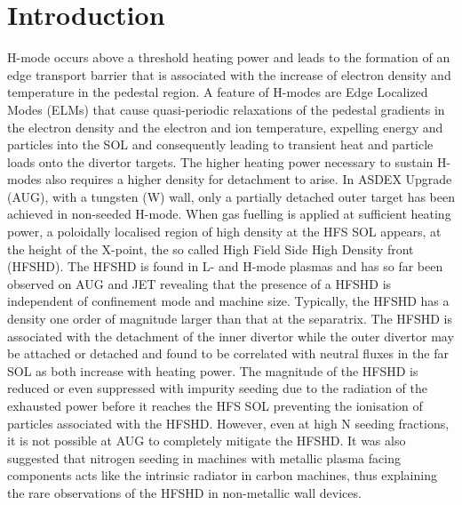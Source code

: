 \documentclass[12pt]{iopart}
\begin{document}
\section{Introduction}
\label{sec:intro}

H-mode occurs above a threshold heating power and leads to the formation of an edge transport barrier that is associated with the increase of electron density and temperature in the pedestal region\cite{wagner1982regime}. A feature of H-modes are Edge Localized Modes (ELMs)\cite{zohm1996edge} that cause quasi-periodic relaxations of the pedestal gradients in the electron density and the electron and ion temperature, expelling energy and particles into the SOL and consequently leading to transient heat and particle loads onto the divertor targets. The higher heating power necessary to sustain H-modes also requires a higher density for detachment\cite{LaBombard1987,krasheninnikov1998physical} to arise. In ASDEX Upgrade (AUG), with a tungsten (W) wall, only a partially detached outer target has been achieved in non-seeded H-mode. When gas fuelling is applied at sufficient heating power, a poloidally localised region of high density at the HFS SOL appears, at the height of the X-point, the so called High Field Side High Density front (HFSHD). The HFSHD is found in L- and H-mode plasmas and has so far been observed on AUG\cite{mccormick2009main,Potzel2015} and JET\cite{potzel2015formation} revealing that the presence of a HFSHD is independent of confinement mode and machine size. Typically, the HFSHD has a density one order of magnitude larger than that at the separatrix. The HFSHD is associated with the detachment of the inner divertor while the outer divertor may be attached or detached and found to be correlated with neutral fluxes in the far SOL as both increase with heating power\cite{Reimold2015}. The magnitude of the HFSHD is reduced or even suppressed with impurity seeding due to the radiation of the exhausted power before it reaches the HFS SOL preventing the ionisation of particles associated with the HFSHD\cite{potzel2015formation}. However, even at high N seeding fractions, it is not possible at AUG to completely mitigate the HFSHD. It was also suggested that nitrogen seeding in machines with metallic plasma facing components acts like the intrinsic radiator in carbon machines\cite{potzel2015formation}, thus explaining the rare observations of the HFSHD in non-metallic wall devices\cite{mccormick2009main}. 
\end{document}
